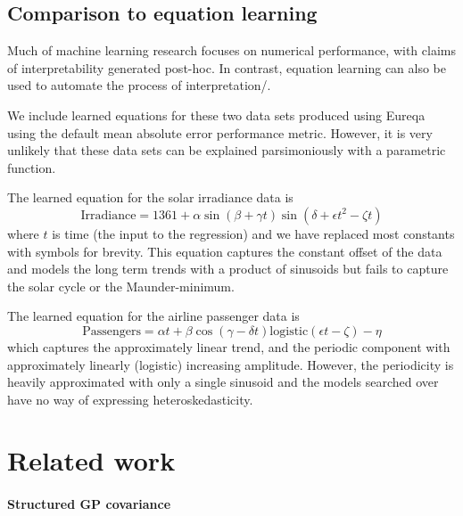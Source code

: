 \documentclass{article}
\begin{document}
\subsection{Comparison to equation learning}

Much of machine learning research focuses on numerical performance, with claims of interpretability generated post-hoc.
In contrast, equation learning \citep{Schmidt2009b} can also be used to automate the process of interpretation/.

We include learned equations for these two data sets produced using Eureqa \citep{Eureqa} using the default mean absolute error performance metric\footnotemark.
However, it is very unlikely that these data sets can be explained parsimoniously with a parametric function.

The learned equation for the solar irradiance data is
\begin{equation}
\textrm{Irradiance} = 1361 + \alpha\sin(\beta + \gamma t)\sin(\delta + \epsilon t^2 - \zeta t)
\end{equation}
where $t$ is time (the input to the regression) and we have replaced most constants with symbols for brevity.
This equation captures the constant offset of the data and models the long term trends with a product of sinusoids but fails to capture the solar cycle or the Maunder-minimum.

The learned equation for the airline passenger data is
\begin{equation}
\textrm{Passengers} = \alpha t + \beta\cos(\gamma - \delta t)\textrm{logistic}(\epsilon t - \zeta) - \eta
\end{equation}
which captures the approximately linear trend, and the periodic component with approximately linearly (logistic) increasing amplitude.
However, the periodicity is heavily approximated with only a single sinusoid and the models searched over have no way of expressing heteroskedasticity.






\section{Related work}

\paragraph{Structured GP covariance}
\end{document}
